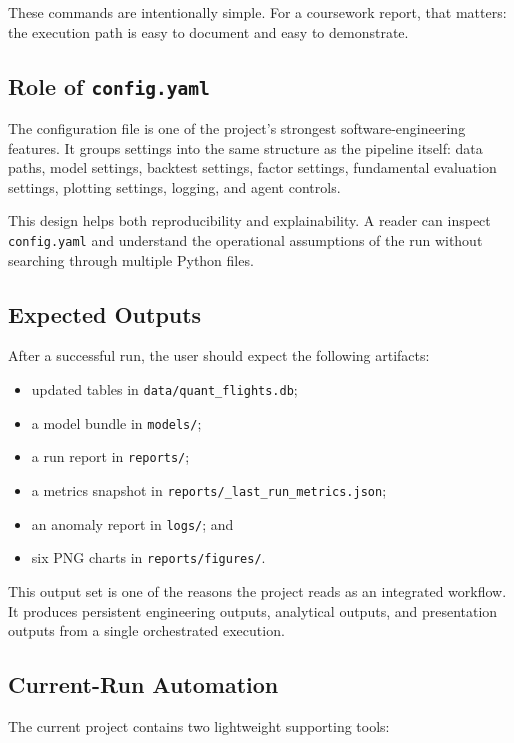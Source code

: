 \documentclass[11pt,a4paper]{article}
\begin{document}
These commands are intentionally simple. For a coursework report, that matters:
the execution path is easy to document and easy to demonstrate.

\subsection{Role of \texttt{config.yaml}}

The configuration file is one of the project’s strongest software-engineering
features. It groups settings into the same structure as the pipeline itself:
data paths, model settings, backtest settings, factor settings, fundamental
evaluation settings, plotting settings, logging, and agent controls.

This design helps both reproducibility and explainability. A reader can inspect
\texttt{config.yaml} and understand the operational assumptions of the run
without searching through multiple Python files.

\subsection{Expected Outputs}

After a successful run, the user should expect the following artifacts:

\begin{itemize}[leftmargin=*]
  \item updated tables in \texttt{data/quant\_flights.db};
  \item a model bundle in \texttt{models/};
  \item a run report in \texttt{reports/};
  \item a metrics snapshot in \texttt{reports/\_last\_run\_metrics.json};
  \item an anomaly report in \texttt{logs/}; and
  \item six PNG charts in \texttt{reports/figures/}.
\end{itemize}

This output set is one of the reasons the project reads as an integrated
workflow. It produces persistent engineering outputs, analytical outputs, and
presentation outputs from a single orchestrated execution.

\subsection{Current-Run Automation}

The current project contains two lightweight supporting tools:
\end{document}
